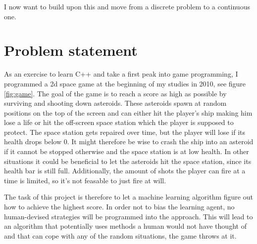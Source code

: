 \documentclass[a4paper,10pt]{article}
\begin{document}
I now want to build upon this and move from a discrete problem to a continuous one.


\section{Problem statement}
% 
As an exercise to learn C++ and take a first peak into game programming, I programmed a 2d space game at the beginning of my studies in 2010, see figure \ref{fig:game}.
The goal of the game is to reach a score as high as possible by surviving and shooting down asteroids.
These asteroids spawn at random positions on the top of the screen and can either hit the player's ship making him lose a life or hit the off-screen space station which the player is supposed to protect. The space station gets repaired over time, but the player will lose if its health drops below $0$.
It might therefore be wise to crash the ship into an asteroid if it cannot be stopped otherwise and the space station is at low health.
In other situations it could be beneficial to let the asteroids hit the space station, since its health bar is still full.
Additionally, the amount of shots the player can fire at a time is limited, so it's not feasable to just fire at will.

The task of this project is therefore to let a machine learning algorithm figure out how to achieve the highest score.
In order not to bias the learning agent, no human-devised strategies will be programmed into the approach.
This will lead to an algorithm that potentially uses methods a human would not have thought of and that can cope with any of the random situations, the game throws at it.
\end{document}
